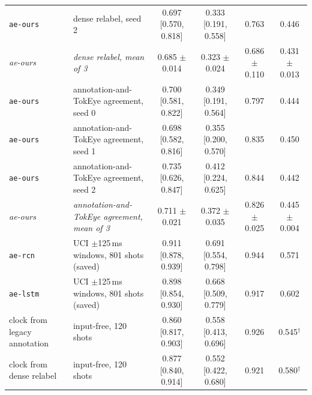 \begin{table}[t]
\begin{tabular}{@{}l>{\raggedright\arraybackslash}p{1.3in}cccc@{}}
\texttt{ae-ours} & dense relabel, seed 2 & 0.697 [0.570, 0.818] & 0.333 [0.191, 0.558] & 0.763 & 0.446 \\
\textit{ae-ours} & \textit{dense relabel, mean of 3} & 0.685 $\pm$ 0.014 & 0.323 $\pm$ 0.024 & 0.686 $\pm$ 0.110 & 0.431 $\pm$ 0.013 \\
\texttt{ae-ours} & annotation-and-TokEye agreement, seed 0 & 0.700 [0.581, 0.822] & 0.349 [0.191, 0.564] & 0.797 & 0.444 \\
\texttt{ae-ours} & annotation-and-TokEye agreement, seed 1 & 0.698 [0.582, 0.816] & 0.355 [0.200, 0.570] & 0.835 & 0.450 \\
\texttt{ae-ours} & annotation-and-TokEye agreement, seed 2 & 0.735 [0.626, 0.847] & 0.412 [0.224, 0.625] & 0.844 & 0.442 \\
\textit{ae-ours} & \textit{annotation-and-TokEye agreement, mean of 3} & 0.711 $\pm$ 0.021 & 0.372 $\pm$ 0.035 & 0.826 $\pm$ 0.025 & 0.445 $\pm$ 0.004 \\
\texttt{ae-rcn} & UCI $\pm$125\,ms windows, 801 shots (saved) & 0.911 [0.878, 0.939] & 0.691 [0.554, 0.798] & 0.944 & 0.571 \\
\texttt{ae-lstm} & UCI $\pm$125\,ms windows, 801 shots (saved) & 0.898 [0.854, 0.930] & 0.668 [0.509, 0.779] & 0.917 & 0.602 \\
clock from legacy annotation & input-free, 120 shots & 0.860 [0.817, 0.903] & 0.558 [0.413, 0.696] & 0.926 & 0.545$^\dagger$ \\
clock from dense relabel & input-free, 120 shots & 0.877 [0.840, 0.914] & 0.552 [0.422, 0.680] & 0.921 & 0.580$^\dagger$ \\
\bottomrule
\end{tabular}
\end{table}
